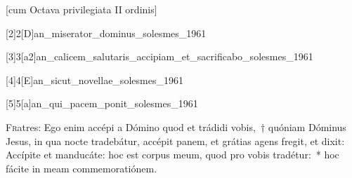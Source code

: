 \documentclass[vesperale_romanum.tex]{subfiles}
\begin{document}


\newpage

\thispagestyle{empty}


\thispagestyle{empty}

 [cum Octava privilegiata II ordinis]

 \label{1_vesperis_cc}





[2]{2}[D]{an_miserator_dominus_solesmes_1961}

 
 

[3]{3}[a2]{an_calicem_salutaris_accipiam_et_sacrificabo_solesmes_1961}
\label{115_3a2} 
{}

[4]{4}[E]{an_sicut_novellae_solesmes_1961}
\label{127_4E}
{}

[5]{5}[a]{an_qui_pacem_ponit_solesmes_1961}
\label{147_5}


\lettrine{F}{r}atres: Ego enim accépi a Dómino quod et trádidi vobis,~† quóniam Dóminus Jesus, in qua no\-cte tradebátur, accépit panem, et grátias agens fregit, et dixit: Accípite et manducáte: hoc est corpus meum, quod pro vobis tradétur:~* hoc fácite in meam commemoratiónem.

 \label{hy_pange_lingua_corpus_christi_solesmes}
\end{document}
